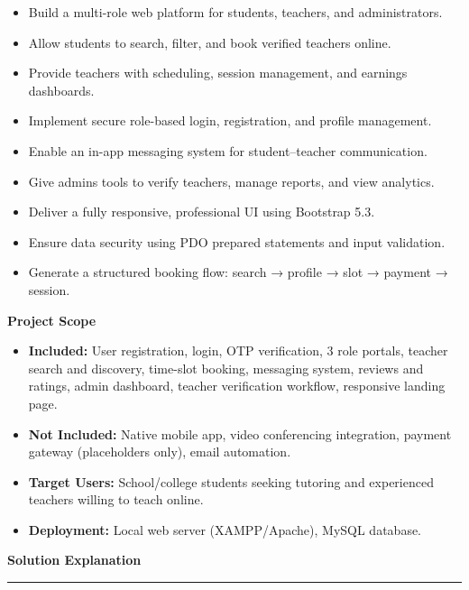 \documentclass[12pt,a4paper]{report}
\begin{document}
\begin{itemize}[leftmargin=1.5em, itemsep=3pt]
    \item Build a multi-role web platform for students, teachers, and administrators.
    \item Allow students to search, filter, and book verified teachers online.
    \item Provide teachers with scheduling, session management, and earnings dashboards.
    \item Implement secure role-based login, registration, and profile management.
    \item Enable an in-app messaging system for student--teacher communication.
    \item Give admins tools to verify teachers, manage reports, and view analytics.
    \item Deliver a fully responsive, professional UI using Bootstrap 5.3.
    \item Ensure data security using PDO prepared statements and input validation.
    \item Generate a structured booking flow: search → profile → slot → payment → session.
\end{itemize}

\vspace{0.5cm}
\textbf{Project Scope}

\begin{itemize}[leftmargin=1.5em, itemsep=3pt]
    \item \textbf{Included:} User registration, login, OTP verification, 3 role portals, teacher search and discovery, time-slot booking, messaging system, reviews and ratings, admin dashboard, teacher verification workflow, responsive landing page.
    \item \textbf{Not Included:} Native mobile app, video conferencing integration, payment gateway (placeholders only), email automation.
    \item \textbf{Target Users:} School/college students seeking tutoring and experienced teachers willing to teach online.
    \item \textbf{Deployment:} Local web server (XAMPP/Apache), MySQL database.
\end{itemize}

\newpage
\thispagestyle{plain}
{\large\bfseries Solution Explanation}\\[0.6pt]
\rule{\textwidth}{0.6pt}
\end{document}
